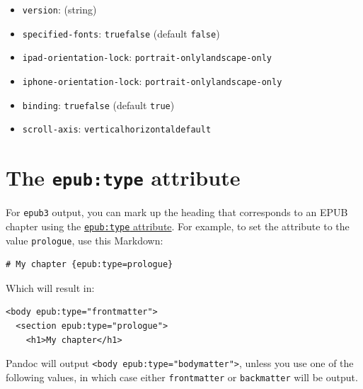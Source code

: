 \documentclass[
  b5paper
]{book}
\providecommand{\tightlist}{%
  \setlength{\itemsep}{0pt}\setlength{\parskip}{0pt}}
\begin{document}
\begin{description}
\begin{itemize}
\tightlist
\item
  \texttt{version}: (string)
\item
  \texttt{specified-fonts}: \texttt{true}\textbar{}\texttt{false}
  (default \texttt{false})
\item
  \texttt{ipad-orientation-lock}:
  \texttt{portrait-only}\textbar{}\texttt{landscape-only}
\item
  \texttt{iphone-orientation-lock}:
  \texttt{portrait-only}\textbar{}\texttt{landscape-only}
\item
  \texttt{binding}: \texttt{true}\textbar{}\texttt{false} (default
  \texttt{true})
\item
  \texttt{scroll-axis}:
  \texttt{vertical}\textbar{}\texttt{horizontal}\textbar{}\texttt{default}
\end{itemize}
\end{description}

\section{\texorpdfstring{The \texttt{epub:type}
attribute}{The epub:type attribute}}\label{the-epubtype-attribute}

For \texttt{epub3} output, you can mark up the heading that corresponds
to an EPUB chapter using the
\href{http://www.idpf.org/epub/31/spec/epub-contentdocs.html\#sec-epub-type-attribute}{\texttt{epub:type}
attribute}. For example, to set the attribute to the value
\texttt{prologue}, use this Markdown:

\begin{verbatim}
# My chapter {epub:type=prologue}
\end{verbatim}

Which will result in:

\begin{verbatim}
<body epub:type="frontmatter">
  <section epub:type="prologue">
    <h1>My chapter</h1>
\end{verbatim}

Pandoc will output
\texttt{\textless{}body\ epub:type="bodymatter"\textgreater{}}, unless
you use one of the following values, in which case either
\texttt{frontmatter} or \texttt{backmatter} will be output.
\end{document}

